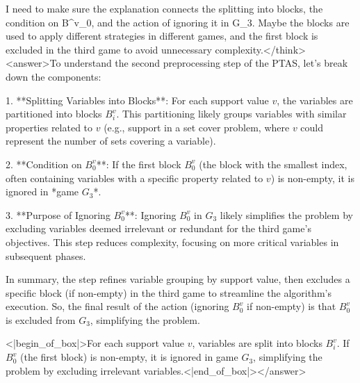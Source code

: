 I need to make sure the explanation connects the splitting into blocks, the condition on B^v_0, and the action of ignoring it in G_3. Maybe the blocks are used to apply different strategies in different games, and the first block is excluded in the third game to avoid unnecessary complexity.</think><answer>To understand the second preprocessing step of the PTAS, let’s break down the components:  

1. **Splitting Variables into Blocks**: For each support value \( v \), the variables are partitioned into blocks \( B^v_i \). This partitioning likely groups variables with similar properties related to \( v \) (e.g., support in a set cover problem, where \( v \) could represent the number of sets covering a variable).  

2. **Condition on \( B^v_0 \)**: If the first block \( B^v_0 \) (the block with the smallest index, often containing variables with a specific property related to \( v \)) is non-empty, it is ignored in *game \( G_3 \)*.  

3. **Purpose of Ignoring \( B^v_0 \)**: Ignoring \( B^v_0 \) in \( G_3 \) likely simplifies the problem by excluding variables deemed irrelevant or redundant for the third game’s objectives. This step reduces complexity, focusing on more critical variables in subsequent phases.  

In summary, the step refines variable grouping by support value, then excludes a specific block (if non-empty) in the third game to streamline the algorithm’s execution.  
So, the final result of the action (ignoring \( B^v_0 \) if non-empty) is that \( B^v_0 \) is excluded from \( G_3 \), simplifying the problem.  

<|begin_of_box|>For each support value \( v \), variables are split into blocks \( B^v_i \). If \( B^v_0 \) (the first block) is non-empty, it is ignored in game \( G_3 \), simplifying the problem by excluding irrelevant variables.<|end_of_box|></answer>